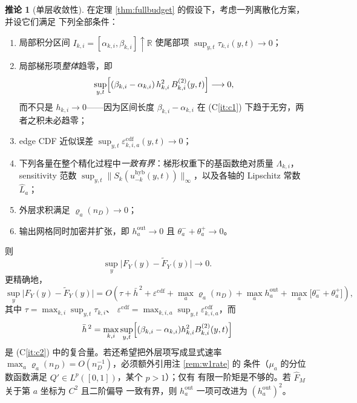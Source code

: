 \documentclass[a4paper,11pt]{article}
\theoremstyle{definition}
\newtheorem{corollary}{推论}
\newcommand{\R}{\mathbb R}
\newcommand{\1}{\mathbf 1}
\newcommand{\ecdf}{\varepsilon^{\mathrm{cdf}}}
\begin{document}
\begin{corollary}[单层收敛性]
\label{cor:convergence}
在定理 \ref{thm:fullbudget} 的假设下，考虑一列离散化方案，并设它们满足
下列全部条件：
\begin{enumerate}[label=(C\arabic*)]
\item\label{it:c1}
局部积分区间 $I_{k,i}=[\alpha_{k,i},\beta_{k,i}]\uparrow\R$ 使尾部项
$\sup_{y,t}\tau_{k,i}(y,t)\to0$；
\item\label{it:c2}
局部梯形项\emph{整体}趋零，即
\[
\sup_{y,t}
\Bigl[(\beta_{k,i}-\alpha_{k,i})\,h_{k,i}^2\,B_{k,i}^{(2)}(y,t)\Bigr]
\longrightarrow0 ,
\]
而不只是 $h_{k,i}\to0$——因为区间长度 $\beta_{k,i}-\alpha_{k,i}$ 在
(C\ref{it:c1}) 下趋于无穷，两者之积未必趋零；
\item\label{it:c3}
edge CDF 近似误差 $\sup_{y,t}\ecdf_{k,i,a}(y,t)\to0$；
\item\label{it:c4}
下列各量在整个精化过程中\emph{一致有界}：梯形权重下的基函数绝对质量
$\Lambda_{k,i}$，sensitivity 范数
$\sup_{y,t}\|S_k(u_{-k}^{\mathrm{hyb}}(y,t))\|_\infty$，以及各轴的
Lipschitz 常数 $\widehat L_a$；
\item\label{it:c5}
外层求积满足 $\varrho_a(n_D)\to0$；
\item\label{it:c6}
输出网格同时加密并扩张，即 $h_a^{\mathrm{out}}\to0$ 且
$\theta_a^-+\theta_a^+\to0$。
\end{enumerate}
则
\[
\sup_y\bigl|F_Y(y)-\widetilde F_Y(y)\bigr|\longrightarrow0 .
\]
更精确地，
\[
\sup_y\bigl|F_Y(y)-\widetilde F_Y(y)\bigr|
=
O\!\left(
\tau
+\bar h^{\,2}
+\ecdf
+\max_a\varrho_a(n_D)
+\max_ah_a^{\mathrm{out}}
+\max_a\bigl[\theta_a^-+\theta_a^+\bigr]
\right),
\]
其中 $\tau=\max_{k,i}\sup_{y,t}\tau_{k,i}$、
$\ecdf=\max_{k,i,a}\sup_{y,t}\ecdf_{k,i,a}$，而
\[
\bar h^{\,2}
=
\max_{k,i}\sup_{y,t}
\Bigl[(\beta_{k,i}-\alpha_{k,i})h_{k,i}^2B_{k,i}^{(2)}(y,t)\Bigr]
\]
是 (C\ref{it:c2}) 中的复合量。若还希望把外层项写成显式速率
$\max_a\varrho_a(n_D)=O(n_D^{-1})$，必须额外引用注 \ref{rem:w1rate} 的
条件（$\mu_a$ 的分位数函数满足 $Q'\in L^p([0,1])$，某个 $p>1$）；仅有
有限一阶矩是不够的。若 $\widehat F_M$ 关于第 $a$ 坐标为 $C^2$ 且二阶偏导
一致有界，则 $h_a^{\mathrm{out}}$ 一项可改进为 $(h_a^{\mathrm{out}})^2$。
\end{corollary}
\end{document}
